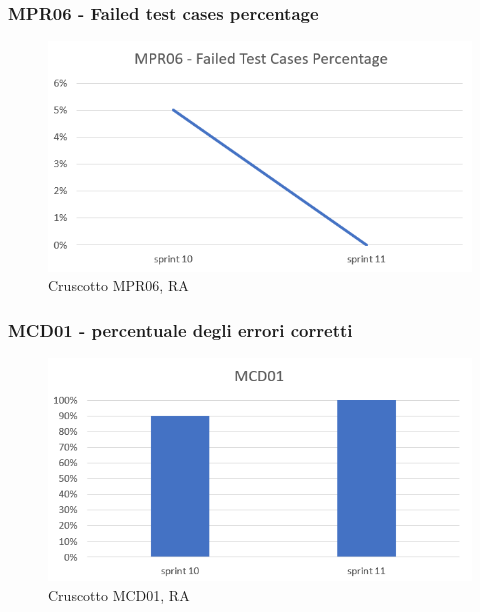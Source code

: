 \subsubsection*{MPR06 - Failed test cases percentage}
\begin{figure}[H] 
    \centering
    \includegraphics[scale = 0.8]{immagini/MPR06.png}
    \caption{Cruscotto MPR06, RA}
\end{figure}

\subsubsection*{MCD01 - percentuale degli errori corretti}
\begin{figure}[H] 
    \centering
    \includegraphics[scale = 0.8]{immagini/MCD01-RA.png}
    \caption{Cruscotto MCD01, RA}
\end{figure}

